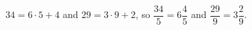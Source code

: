 $34=6\cdot5+4$ and $29=3\cdot9+2$, so $\dfrac{34}5=\boxed{6\dfrac45}$ and $\dfrac{29}9=\boxed{3\dfrac29}$.
